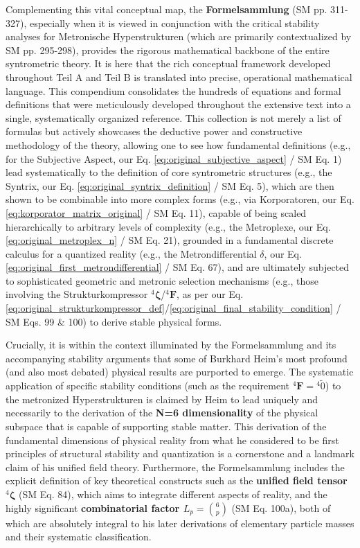 \documentclass[12pt]{article}
\newcommand{\metrondifferential}{\delta}
\newcommand{\strukturkompressor}{{}^4\bm{\zeta}}
\newcommand{\metronisiertekondensor}[1]{{}^{#1}\mathbf{F}}
\begin{document}
Complementing this vital conceptual map, the \textbf{Formelsammlung} (SM pp. 311-327), especially when it is viewed in conjunction with the critical stability analyses for Metronische Hyperstrukturen (which are primarily contextualized by SM pp. 295-298), provides the rigorous mathematical backbone of the entire syntrometric theory. It is here that the rich conceptual framework developed throughout Teil A and Teil B is translated into precise, operational mathematical language. This compendium consolidates the hundreds of equations and formal definitions that were meticulously developed throughout the extensive text into a single, systematically organized reference. This collection is not merely a list of formulas but actively showcases the deductive power and constructive methodology of the theory, allowing one to see how fundamental definitions (e.g., for the Subjective Aspect, our Eq. \eqref{eq:original_subjective_aspect} / SM Eq. 1) lead systematically to the definition of core syntrometric structures (e.g., the Syntrix, our Eq. \eqref{eq:original_syntrix_definition} / SM Eq. 5), which are then shown to be combinable into more complex forms (e.g., via Korporatoren, our Eq. \eqref{eq:korporator_matrix_original} / SM Eq. 11), capable of being scaled hierarchically to arbitrary levels of complexity (e.g., the Metroplexe, our Eq. \eqref{eq:original_metroplex_n} / SM Eq. 21), grounded in a fundamental discrete calculus for a quantized reality (e.g., the Metrondifferential \( \metrondifferential \), our Eq. \eqref{eq:original_first_metrondifferential} / SM Eq. 67), and are ultimately subjected to sophisticated geometric and metronic selection mechanisms (e.g., those involving the Strukturkompressor \( \strukturkompressor \)/\( \metronisiertekondensor{4} \), as per our Eq. \eqref{eq:original_strukturkompressor_def}/\eqref{eq:original_final_stability_condition} / SM Eqs. 99 \& 100) to derive stable physical forms.

Crucially, it is within the context illuminated by the Formelsammlung and its accompanying stability arguments that some of Burkhard Heim's most profound (and also most debated) physical results are purported to emerge. The systematic application of specific stability conditions (such as the requirement \( \metronisiertekondensor{4} = {}^{4}\tilde{0} \)) to the metronized Hyperstrukturen is claimed by Heim to lead uniquely and necessarily to the derivation of the \textbf{N=6 dimensionality} of the physical subspace that is capable of supporting stable matter. This derivation of the fundamental dimensions of physical reality from what he considered to be first principles of structural stability and quantization is a cornerstone and a landmark claim of his unified field theory. Furthermore, the Formelsammlung includes the explicit definition of key theoretical constructs such as the \textbf{unified field tensor \( \strukturkompressor \)} (SM Eq. 84), which aims to integrate different aspects of reality, and the highly significant \textbf{combinatorial factor \( L_p = \binom{6}{p} \)} (SM Eq. 100a), both of which are absolutely integral to his later derivations of elementary particle masses and their systematic classification.
\end{document}
